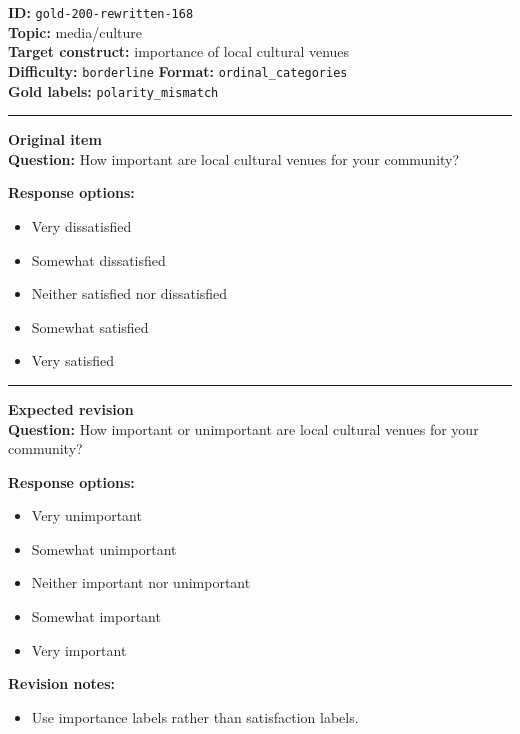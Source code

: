 \documentclass[10pt,a4paper]{article}
\newcommand{\sectionline}{\vspace{0.15em}\hrule\vspace{0.35em}}
\begin{document}
\begin{tcolorbox}[colframe=FlawRed,colback=white,colbacktitle=FlawRed!9,coltitle=black,title={Item 168\hfill Flawed item}]
\textbf{ID:} \texttt{gold-200-rewritten-168}\\
\textbf{Topic:} media/culture\\
\textbf{Target construct:} importance of local cultural venues\\
\textbf{Difficulty:} \texttt{borderline} \quad \textbf{Format:} \texttt{ordinal\_categories}\\
\textbf{Gold labels:} \texttt{polarity\_mismatch}\\
\sectionline
\textbf{Original item}\\
\textbf{Question:} How important are local cultural venues for your community?
\par\textbf{Response options:}
\begin{itemize}
\item Very dissatisfied
\item Somewhat dissatisfied
\item Neither satisfied nor dissatisfied
\item Somewhat satisfied
\item Very satisfied
\end{itemize}
\sectionline
\textbf{Expected revision}\\
\textbf{Question:} How important or unimportant are local cultural venues for your community?
\par\textbf{Response options:}
\begin{itemize}
\item Very unimportant
\item Somewhat unimportant
\item Neither important nor unimportant
\item Somewhat important
\item Very important
\end{itemize}
\par\textbf{Revision notes:}
\begin{itemize}
\item Use importance labels rather than satisfaction labels.
\end{itemize}
\end{tcolorbox}
\end{document}
